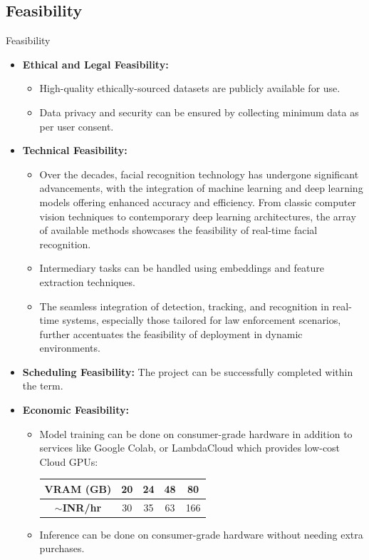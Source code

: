 \subsection{Feasibility}
\begin{frame}[allowframebreaks]{Feasibility}
	\begin{itemize}
		\item \textbf{Ethical and Legal Feasibility:}
			\begin{itemize}
				\item High-quality ethically-sourced datasets are publicly available for use.
				\item Data privacy and security can be ensured by collecting minimum data as per user consent.
			\end{itemize}
		\item \textbf{Technical Feasibility:}
			\begin{itemize}
				\item Over the decades, facial recognition technology has undergone significant advancements, with the integration of machine learning and deep learning models offering enhanced accuracy and efficiency. From classic computer vision techniques to contemporary deep learning architectures, the array of available methods showcases the feasibility of real-time facial recognition.
				\item Intermediary tasks can be handled using embeddings and feature extraction techniques.
				\item The seamless integration of detection, tracking, and recognition in real-time systems, especially those tailored for law enforcement scenarios, further accentuates the feasibility of deployment in dynamic environments.
			\end{itemize}
		\item \textbf{Scheduling Feasibility:} The project can be successfully completed within the term.
		
		\item \textbf{Economic Feasibility:}
			\begin{itemize}
				\item Model training can be done on consumer-grade hardware in addition to services like Google Colab, or LambdaCloud which provides low-cost Cloud GPUs:
				\begin{table}
					\vspace*{0.25cm}
					\centering
					\begin{tabular}{c|c|c|c|c}
						\textbf{VRAM (GB)} & 20 & 24 & 48 & 80 \\
						\hline
						\textbf{$\sim$INR/hr} & 30 & 35 & 63 & 166 \\
					\end{tabular}
					\vspace*{0.25cm}
				\end{table}
				\item Inference can be done on consumer-grade hardware without needing extra purchases.
			\end{itemize}


\end{itemize}
\end{frame}

